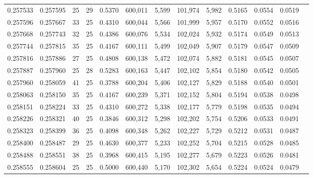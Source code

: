 \begin{tabular}{rrrrrrrrrrrrr}
0.257533 & 0.257595 &    25 &  29 &                                     0.5370 & 600,011 &   5,599 & 101,974 &   5,982 & 0.5165 & 0.0554 & 0.0519 \\
0.257596 & 0.257667 &    33 &  25 &                                     0.4310 & 600,044 &   5,566 & 101,999 &   5,957 & 0.5170 & 0.0552 & 0.0516 \\
0.257668 & 0.257743 &    32 &  25 &                                     0.4386 & 600,076 &   5,534 & 102,024 &   5,932 & 0.5174 & 0.0549 & 0.0513 \\
0.257744 & 0.257815 &    35 &  25 &                                     0.4167 & 600,111 &   5,499 & 102,049 &   5,907 & 0.5179 & 0.0547 & 0.0509 \\
0.257816 & 0.257886 &    27 &  25 &                                     0.4808 & 600,138 &   5,472 & 102,074 &   5,882 & 0.5181 & 0.0545 & 0.0507 \\
0.257887 & 0.257960 &    25 &  28 &                                     0.5283 & 600,163 &   5,447 & 102,102 &   5,854 & 0.5180 & 0.0542 & 0.0505 \\
0.257960 & 0.258059 &    41 &  25 &                                     0.3788 & 600,204 &   5,406 & 102,127 &   5,829 & 0.5188 & 0.0540 & 0.0501 \\
0.258063 & 0.258150 &    35 &  25 &                                     0.4167 & 600,239 &   5,371 & 102,152 &   5,804 & 0.5194 & 0.0538 & 0.0498 \\
0.258151 & 0.258224 &    33 &  25 &                                     0.4310 & 600,272 &   5,338 & 102,177 &   5,779 & 0.5198 & 0.0535 & 0.0494 \\
0.258226 & 0.258321 &    40 &  25 &                                     0.3846 & 600,312 &   5,298 & 102,202 &   5,754 & 0.5206 & 0.0533 & 0.0491 \\
0.258323 & 0.258399 &    36 &  25 &                                     0.4098 & 600,348 &   5,262 & 102,227 &   5,729 & 0.5212 & 0.0531 & 0.0487 \\
0.258400 & 0.258487 &    29 &  25 &                                     0.4630 & 600,377 &   5,233 & 102,252 &   5,704 & 0.5215 & 0.0528 & 0.0485 \\
0.258488 & 0.258551 &    38 &  25 &                                     0.3968 & 600,415 &   5,195 & 102,277 &   5,679 & 0.5223 & 0.0526 & 0.0481 \\
0.258555 & 0.258604 &    25 &  25 &                                     0.5000 & 600,440 &   5,170 & 102,302 &   5,654 & 0.5224 & 0.0524 & 0.0479 \\

\end{tabular}
